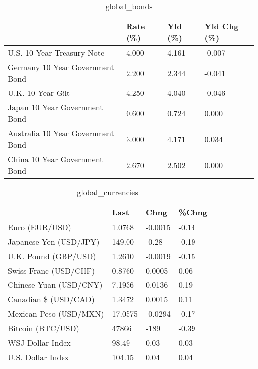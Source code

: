 \documentclass{article}%
\begin{document}
%


\begin{table}[htbp]%
\caption{global\_bonds}%
\centering%
\begin{adjustbox}{width=1\textwidth}%
\begin{tabular}{llll}
\toprule
                                  & Rate (\%) & Yld (\%) & Yld Chg (\%) \\
\midrule
       U.S. 10 Year Treasury Note &    4.000 &   4.161 &      -0.007 \\
  Germany 10 Year Government Bond &    2.200 &   2.344 &      -0.041 \\
                U.K. 10 Year Gilt &    4.250 &   4.040 &      -0.046 \\
    Japan 10 Year Government Bond &    0.600 &   0.724 &       0.000 \\
Australia 10 Year Government Bond &    3.000 &   4.171 &       0.034 \\
    China 10 Year Government Bond &    2.670 &   2.502 &       0.000 \\
\bottomrule
\end{tabular}
%
\end{adjustbox}%
\end{table}

%


\begin{table}[htbp]%
\caption{global\_currencies}%
\centering%
\begin{adjustbox}{width=1\textwidth}%
\begin{tabular}{llll}
\toprule
                       &    Last &    Chng & \%Chng \\
\midrule
        Euro (EUR/USD) &  1.0768 & -0.0015 & -0.14 \\
Japanese Yen (USD/JPY) &  149.00 &   -0.28 & -0.19 \\
  U.K. Pound (GBP/USD) &  1.2610 & -0.0019 & -0.15 \\
 Swiss Franc (USD/CHF) &  0.8760 &  0.0005 &  0.06 \\
Chinese Yuan (USD/CNY) &  7.1936 &  0.0136 &  0.19 \\
  Canadian \$ (USD/CAD) &  1.3472 &  0.0015 &  0.11 \\
Mexican Peso (USD/MXN) & 17.0575 & -0.0294 & -0.17 \\
     Bitcoin (BTC/USD) &   47866 &    -189 & -0.39 \\
      WSJ Dollar Index &   98.49 &    0.03 &  0.03 \\
     U.S. Dollar Index &  104.15 &    0.04 &  0.04 \\
\bottomrule
\end{tabular}
%
\end{adjustbox}%
\end{table}
\end{document}
